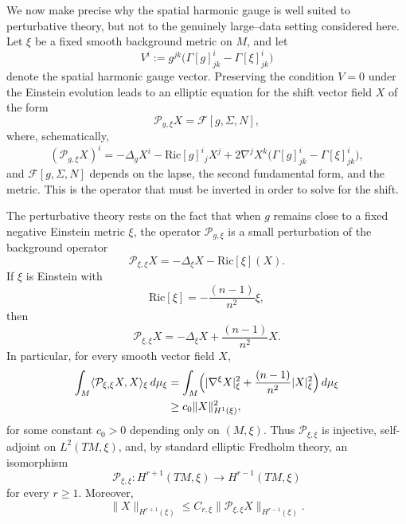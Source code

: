 \documentclass{amsart}
\begin{document}
\medskip

\noindent We now make precise why the spatial harmonic gauge is well suited to perturbative
theory, but not to the genuinely large--data setting considered here. Let \(\xi\) be a fixed smooth background metric on \(M\), and let
\[
V^{i}:=g^{jk}\bigl(\Gamma[g]^{i}_{jk}-\Gamma[\xi]^{i}_{jk}\bigr)
\]
denote the spatial harmonic gauge vector. Preserving the condition \(V=0\) under the
Einstein evolution leads to an elliptic equation for the shift vector field \(X\) of the form
\begin{equation}
\label{eq:shift_operator_intro}
\mathcal P_{g,\xi}X=\mathcal F[g,\Sigma,N],
\end{equation}
where, schematically,
\begin{equation}
\label{eq:P_g_xi_intro}
(\mathcal P_{g,\xi}X)^{i}
=
-\Delta_{g}X^{i}
-\text{Ric}[g]^{i}{}_{j}X^{j}
+
2\nabla^{j}X^{k}\bigl(\Gamma[g]^{i}_{jk}-\Gamma[\xi]^{i}_{jk}\bigr),
\end{equation}
and \(\mathcal F[g,\Sigma,N]\) depends on the lapse, the second fundamental form, and the
metric.  This is the operator that must be inverted in order to solve for the shift.

\noindent The perturbative theory rests on the fact that when \(g\) remains close to a fixed negative
Einstein metric \(\xi\), the operator \(\mathcal P_{g,\xi}\) is a small perturbation of the
background operator
\begin{equation}
\label{eq:P_background_intro}
\mathcal P_{\xi,\xi}X
=
-\Delta_{\xi}X-\text{Ric}[\xi](X).
\end{equation}
If \(\xi\) is Einstein with
\[
\text{Ric}[\xi]=-\frac{(n-1)}{n^{2}}\xi,
\]
then
\begin{equation}
\label{eq:P_background_hyperbolic_intro}
\mathcal P_{\xi,\xi}X
=
-\Delta_{\xi}X+\frac{(n-1)}{n^{2}}X.
\end{equation}
In particular, for every smooth vector field \(X\),
\begin{align}
\label{eq:background_coercive_intro}
\int_{M}\langle \mathcal P_{\xi,\xi}X,X\rangle_{\xi}\,d\mu_{\xi}
&=
\int_{M}\Bigl(|\nabla^{\xi}X|_{\xi}^{2}+\frac{(n-1)}{n^{2}}|X|_{\xi}^{2}\Bigr)\,d\mu_{\xi} \\
&\ge c_{0}\|X\|_{H^{1}(\xi)}^{2}, \nonumber
\end{align}
for some constant \(c_{0}>0\) depending only on \((M,\xi)\).  Thus
\(\mathcal P_{\xi,\xi}\) is injective, self-adjoint on \(L^{2}(TM,\xi)\), and, by standard
elliptic Fredholm theory, an isomorphism
\[
\mathcal P_{\xi,\xi}\colon H^{r+1}(TM,\xi)\longrightarrow H^{r-1}(TM,\xi)
\]
for every \(r\ge1\).  Moreover,
\begin{equation}
\label{eq:background_elliptic_estimate_intro}
\|X\|_{H^{r+1}(\xi)}
\le C_{r,\xi}\|\mathcal P_{\xi,\xi}X\|_{H^{r-1}(\xi)}.
\end{equation}
\end{document}
